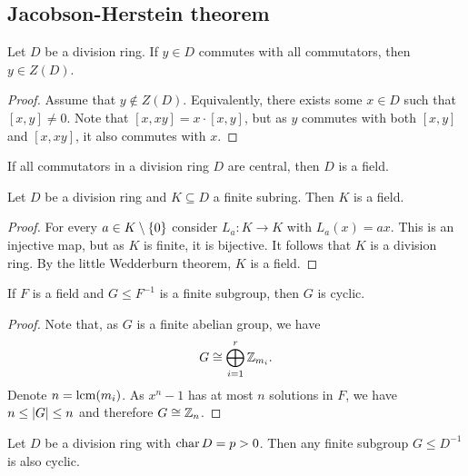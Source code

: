 \newpage

\subsection{Jacobson-Herstein theorem}


\begin{trditev}
Let $D$ be a division ring. If $y \in D$ commutes with all
commutators, then $y \in Z(D)$.
\end{trditev}

\begin{proof}
Assume that $y \not \in Z(D)$. Equivalently, there exists some
$x \in D$ such that $[x,y] \ne 0$. Note that
$[x,xy] = x \cdot [x,y]$, but as $y$ commutes with both
$[x,y]$ and $[x,xy]$, it also commutes with $x$.
\end{proof}

\begin{posledica}
\label{cen_alg:cor:com_field}
If all commutators in a division ring $D$ are central, then $D$ is
a field.
\end{posledica}

\begin{trditev}
Let $D$ be a division ring and $K \subseteq D$ a finite subring.
Then $K$ is a field.
\end{trditev}

\begin{proof}
For every $a \in K \setminus \left\{0\right\}$ consider $L_a \colon K \to K$
with $L_a(x) = ax$. This is an injective map, but as $K$ is finite,
it is bijective. It follows that $K$ is a division ring. By the
little Wedderburn theorem, $K$ is a field.
\end{proof}

\begin{lema}
If $F$ is a field and $G \leq F^{-1}$ is a finite subgroup, then
$G$ is cyclic.
\end{lema}

\begin{proof}
Note that, as $G$ is a finite abelian group, we have
\[
G \cong \bigoplus_{i=1}^r \mathbb{Z}_{m_i}.
\]
Denote $n = \operatorname{lcm}(m_i)$. As $x^n - 1$ has at most $n$ solutions in
$F$, we have $n \leq \left\lvert G\right\rvert \leq n$ and therefore $G \cong \mathbb{Z}_n$.
\end{proof}

\begin{posledica}
Let $D$ be a division ring with $\operatorname{char} D = p > 0$. Then any finite
subgroup $G \leq D^{-1}$ is also cyclic.
\end{posledica}

